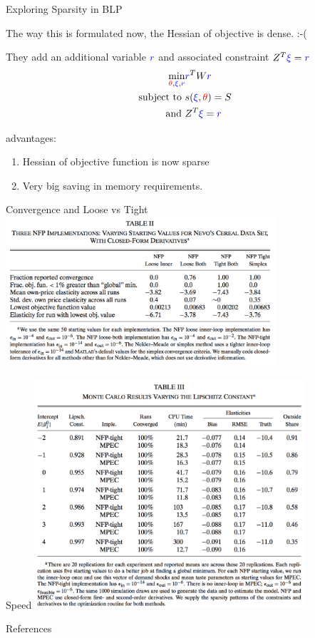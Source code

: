 \documentclass[english]{beamer}
\begin{document}
\begin{frame}{Exploring Sparsity in BLP}
\begin{midi}
\item The way this is formulated now, the Hessian of objective is dense. :-(
\item They add an additional variable ${\color{blue}{r}}$ and associated constraint $Z^T {\color{blue}{\xi}}={\color{blue}{r}}$
\begin{align*}
\min_{{\color{red}{\theta}},{\color{blue}{\xi}},{\color{blue}{r}}} & {\color{blue}{r}}^T W {\color{blue}{r}} \\
\text{subject to } & s({\color{blue}{\xi}},{\color{red}{\theta}}) = S \\
\text{ and       } & Z^T {\color{blue}{\xi}}={\color{blue}{r}}
\end{align*}
\item advantages: 
\begin{enumerate}
\item Hessian of objective function is now sparse
\item Very big saving in memory requirements.
\end{enumerate}
\end{midi}
\end{frame}

\begin{frame}{Convergence and Loose vs Tight}
\includegraphics[width=10cm]{dube-2.png}

\end{frame}

\begin{frame}{Speed}
\includegraphics[width=10cm]{dube-3.png}

\end{frame}

\begin{frame}[allowframebreaks]{References}

		
		
\end{frame}
\end{document}
